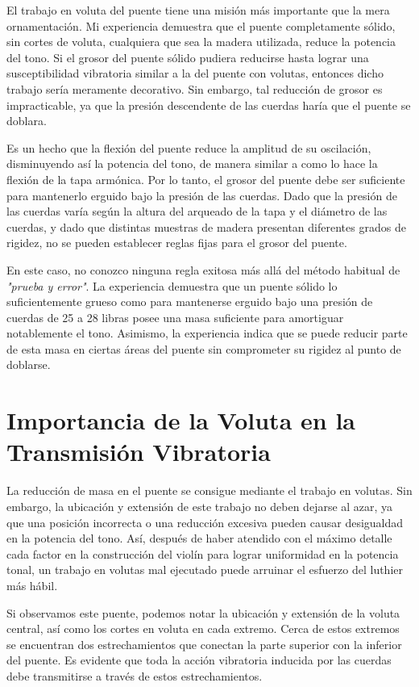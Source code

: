 \documentclass[12pt]{book}
\begin{document}
El trabajo en voluta del puente tiene una misión más importante que la mera ornamentación. Mi experiencia demuestra que el puente completamente sólido, sin cortes de voluta, cualquiera que sea la madera utilizada, reduce la potencia del tono. Si el grosor del puente sólido pudiera reducirse hasta lograr una susceptibilidad vibratoria similar a la del puente con volutas, entonces dicho trabajo sería meramente decorativo. Sin embargo, tal reducción de grosor es impracticable, ya que la presión descendente de las cuerdas haría que el puente se doblara. 

Es un hecho que la flexión del puente reduce la amplitud de su oscilación, disminuyendo así la potencia del tono, de manera similar a como lo hace la flexión de la tapa armónica. Por lo tanto, el grosor del puente debe ser suficiente para mantenerlo erguido bajo la presión de las cuerdas. Dado que la presión de las cuerdas varía según la altura del arqueado de la tapa y el diámetro de las cuerdas, y dado que distintas muestras de madera presentan diferentes grados de rigidez, no se pueden establecer reglas fijas para el grosor del puente. 

En este caso, no conozco ninguna regla exitosa más allá del método habitual de \textit{"prueba y error"}. La experiencia demuestra que un puente sólido lo suficientemente grueso como para mantenerse erguido bajo una presión de cuerdas de 25 a 28 libras posee una masa suficiente para amortiguar notablemente el tono. Asimismo, la experiencia indica que se puede reducir parte de esta masa en ciertas áreas del puente sin comprometer su rigidez al punto de doblarse.

\section*{Importancia de la Voluta en la Transmisión Vibratoria}

La reducción de masa en el puente se consigue mediante el trabajo en volutas. Sin embargo, la ubicación y extensión de este trabajo no deben dejarse al azar, ya que una posición incorrecta o una reducción excesiva pueden causar desigualdad en la potencia del tono. Así, después de haber atendido con el máximo detalle cada factor en la construcción del violín para lograr uniformidad en la potencia tonal, un trabajo en volutas mal ejecutado puede arruinar el esfuerzo del luthier más hábil.

Si observamos este puente, podemos notar la ubicación y extensión de la voluta central, así como los cortes en voluta en cada extremo. Cerca de estos extremos se encuentran dos estrechamientos que conectan la parte superior con la inferior del puente. Es evidente que toda la acción vibratoria inducida por las cuerdas debe transmitirse a través de estos estrechamientos. 
\end{document}
